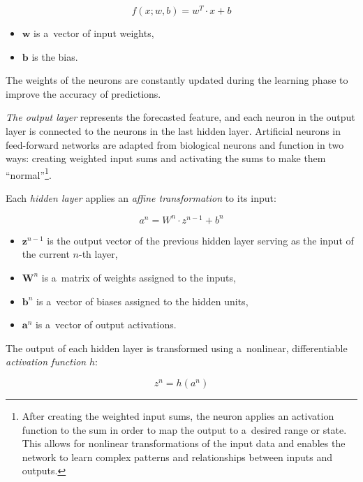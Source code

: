 \begin{equation}\label{weights}
f(x; w, b)=w^T \cdot x+b
\end{equation}

\begin{itemize}
    \item $\mathbf{w}$ is a~vector of input weights,
    \item $\mathbf{b}$ is the bias.
\end{itemize}

The weights of the neurons are constantly updated during the learning phase to improve the accuracy of predictions.

\textit{The output layer} represents the forecasted feature, and each neuron in the output layer is connected to the neurons in the last hidden layer. Artificial neurons in feed-forward networks are adapted from biological neurons and function in two ways: creating weighted input sums and activating the sums to make them ``normal''\footnote{After creating the weighted input sums, the neuron applies an activation function to the sum in order to map the output to a~desired range or state. This allows for nonlinear transformations of the input data and enables the network to learn complex patterns and relationships between inputs and outputs.}.

Each \textit{hidden layer} applies an \textit{affine transformation} to its input:

\begin{equation}\label{transformation}
a^n=W^n \cdot z^{n-1}+b^n
\end{equation}

\begin{itemize}
    \item $\mathbf{z}^{n-1}$ is the output vector of the previous hidden layer serving as the input of the current $n$-th layer,
    \item $\mathbf{W}^n$ is a~matrix of weights assigned to the inputs,
    \item $\mathbf{b}^n$ is a~vector of biases assigned to the hidden units,
    \item $\mathbf{a}^n$ is a~vector of output activations.
\end{itemize}

The output of each hidden layer is transformed using a~nonlinear, differentiable \textit{activation function} $h$:

\begin{equation}\label{activation}
z^n=h\left(a^n\right)
\end{equation}

